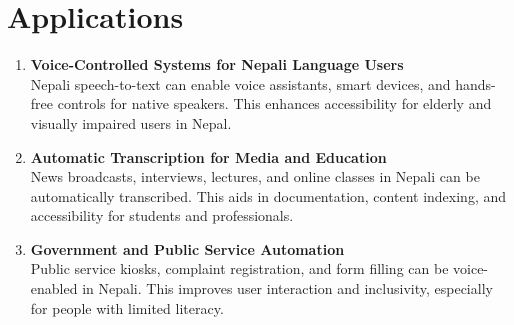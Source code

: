 \section{Applications}
\begin{enumerate}
    \item \textbf{Voice-Controlled Systems for Nepali Language Users}\\
    Nepali speech-to-text can enable voice assistants, smart devices, and hands-free controls for native speakers. This enhances accessibility for elderly and visually impaired users in Nepal.
    
    \item \textbf{Automatic Transcription for Media and Education}\\
    News broadcasts, interviews, lectures, and online classes in Nepali can be automatically transcribed. This aids in documentation, content indexing, and accessibility for students and professionals.\\

    
    \item \textbf{Government and Public Service Automation}\\
    Public service kiosks, complaint registration, and form filling can be voice-enabled in Nepali. This improves user interaction and inclusivity, especially for people with limited literacy.
\end{enumerate}




